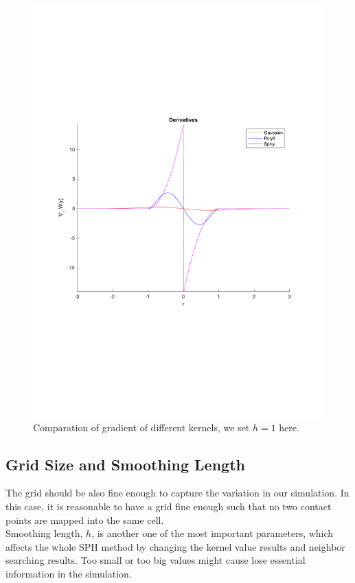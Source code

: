     \begin{figure}[!ht]
        \centering
        \includegraphics[scale = 0.5]{Figures/kenels_de}
        \caption{Comparation of gradient of different kernels, we set $h = 1$ here. }
        \label{fg:gradient}
    \end{figure}

    \subsection{Grid Size and Smoothing Length}
    \label{gs}
    The grid should be also fine enough to capture the variation in our simulation. In this case, it is reasonable to have a grid fine enough such that no two contact points are mapped into the same cell. \\

    Smoothing length, $h$, is another one of the most important parameters, which affects the whole SPH method by changing the kernel value results and neighbor searching results. Too small or too big values might cause lose essential information in the simulation.

